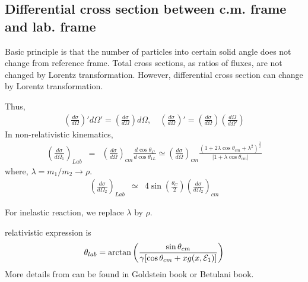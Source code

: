 \documentclass[10pt]{book}
\newcommand{\bea}{\begin{eqnarray}}
\newcommand{\eea}{\end{eqnarray}}
\begin{document}
\subsection{Differential cross section between c.m. frame and lab. frame}

Basic principle is that the number of particles 
into certain solid angle does not change from reference frame.
Total cross sections, as ratios of fluxes, are not changed by Lorentz transformation.
However, differential cross section can change by Lorentz transformation.

Thus,
\bea
\left(\frac{d\sigma}{d\Omega}\right)' d\Omega'
=\left(\frac{d\sigma}{d\Omega}\right) d\Omega,\quad
\left(\frac{d\sigma}{d\Omega}\right)'=\left(\frac{d\sigma}{d\Omega}\right)
 \left(\frac{d\Omega}{d\Omega'}\right)
\eea
In non-relativistic kinematics,
\bea
\left(\frac{d\sigma}{d\Omega_1}\right)_{Lab}
&=&\left(\frac{d\sigma}{d\Omega}\right)_{cm}
    \frac{d\cos\theta_{C}}{d\cos\theta_{1L}}
  \simeq \left(\frac{d\sigma}{d\Omega}\right)_{cm} 
  \frac{(1+2\lambda \cos\theta_{cm}+\lambda^2)^{\frac{3}{2}}}
   {|1+\lambda \cos\theta_{cm}|}
\eea
where, $\lambda=m_1/m_2\to \rho $.
\bea
\left(\frac{d\sigma}{d\Omega_2}\right)_{Lab}
&\simeq&4\sin(\frac{\theta_C}{2})\left(\frac{d\sigma}{d\Omega_2}\right)_{cm}
\eea

For inelastic reaction, we replace $\lambda$ by
$\rho$. 

relativistic  expression is 
\bea 
\theta_{lab} = \arctan\left(\frac{\sin\theta_{cm}}{\gamma[\cos\theta_{cm}+x g (x, {\cal E}_1)]} \right) 
\eea 
More details from can be found in Goldstein book or Betulani book. 
\end{document}
